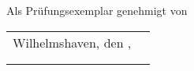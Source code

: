\vfill

\begin{flushright}
	Als Prüfungsexemplar genehmigt von\\
	\vspace{1cm}
	\begin{tabular}{rr}
		Wilhelmshaven, den \thesistimehandin, & \hspace*{5cm}\\[0mm]
		\cline{2-2}\\[2mm]    %
		& \thesisreviewerone  %
	\end{tabular}
\end{flushright}

\renewcommand{\arraystretch}{1}

\cleardoublepage
